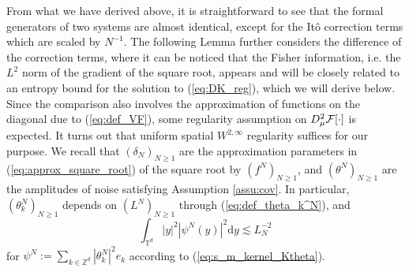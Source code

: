 From what we have derived above, it is straightforward to see that the formal generators of two systems are almost identical, except for the It\^o correction terms which are scaled by $N^{-1}$. The following Lemma further considers the difference of the correction terms, where it can be noticed that the Fisher information, i.e. the $L^2$ norm of the gradient of the square root, appears and will be closely related to an entropy bound for the solution to (\ref{eq:DK_reg}), which we will derive below. \\

Since the comparison also involves the approximation of functions on the diagonal due to (\ref{eq:def_VF}), some regularity assumption on $D^2_{\mu}\mathcal{F}[\cdot]$ is expected. It turns out that uniform spatial $W^{2,\infty}$ regularity suffices for our purpose. We recall that $(\delta_N)_{N \geq 1}$ are the approximation parameters in (\ref{eq:approx_square_root}) of the square root by $(f^N)_{N \geq 1}$, and $(\theta^N)_{N \geq 1}$ are the amplitudes of noise satisfying Assumption \ref{assu:cov}. In particular, $(\theta_k^N)_{N \geq 1}$ depends on $(L^N)_{N \geq 1}$ through (\ref{eq:def_theta_k^N}), and
\[
\int_{\mathbb{T}^d} |y|^2|\psi^N(y)|^2\mathrm{d}y \lesssim L_N^{-2}
\]
for $\psi^N := \sum_{k \in \mathbb{Z}^d}|\theta_k^N|^2e_k$ according to (\ref{eq:s_m_kernel_Ktheta}).

